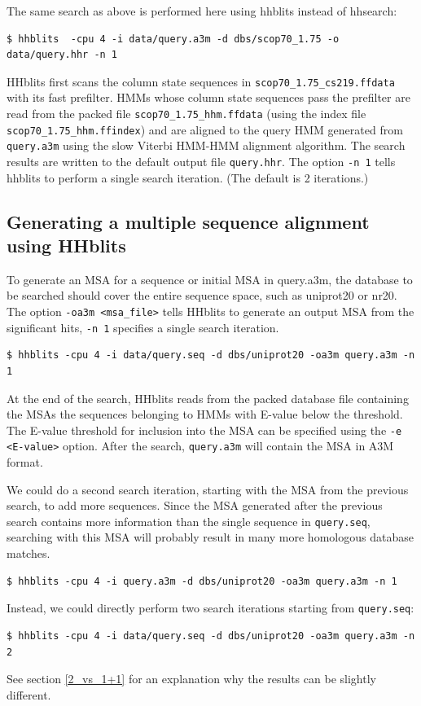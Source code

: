 \documentclass[11pt,a4paper]{article}
\begin{document}
The same search as above is performed here using hhblits instead of hhsearch:
\begin{verbatim}
$ hhblits  -cpu 4 -i data/query.a3m -d dbs/scop70_1.75 -o data/query.hhr -n 1
\end{verbatim}

HHblits first scans the column state sequences in \verb`scop70_1.75_cs219.ffdata` with its fast prefilter. HMMs whose column state sequences pass the prefilter are read from the packed file \verb`scop70_1.75_hhm.ffdata` (using the index file \verb`scop70_1.75_hhm.ffindex`) and are aligned to the query HMM generated from \verb`query.a3m` using the slow Viterbi HMM-HMM alignment algorithm. The search results are written to the default output file \verb`query.hhr`. The option \verb`-n 1` tells hhblits to perform a single search iteration. (The default is 2 iterations.)


\subsection{Generating a multiple sequence alignment using HHblits}\label{msa_hhblits}

To generate an MSA for a sequence or initial MSA in query.a3m, the database to be searched should cover the entire sequence space, such as uniprot20 or nr20. The option \verb`-oa3m <msa_file>` tells HHblits to generate an output MSA from the significant hits, \verb`-n 1` specifies a single search iteration.
\begin{verbatim}
$ hhblits -cpu 4 -i data/query.seq -d dbs/uniprot20 -oa3m query.a3m -n 1
\end{verbatim}

At the end of the search, HHblits reads from the packed database file containing the MSAs the sequences belonging to HMMs with E-value below the threshold. The E-value threshold for inclusion into the MSA can be specified using the \verb`-e <E-value>` option. After the search, \verb`query.a3m` will contain the MSA in A3M format.

We could do a second search iteration, starting with the MSA from the previous search, to add more sequences. Since the MSA generated after the previous search contains more information than the single sequence in \verb`query.seq`, searching with this MSA will probably result in many more homologous database matches.
\begin{verbatim}
$ hhblits -cpu 4 -i query.a3m -d dbs/uniprot20 -oa3m query.a3m -n 1
\end{verbatim}
Instead, we could directly perform two search iterations starting from \verb`query.seq`:
\begin{verbatim}
$ hhblits -cpu 4 -i data/query.seq -d dbs/uniprot20 -oa3m query.a3m -n 2 
\end{verbatim}
See section \ref{2_vs_1+1} for an explanation why the results can be slightly different.
\end{document}
